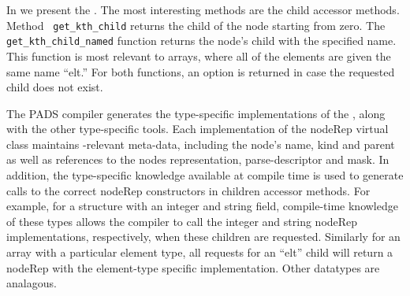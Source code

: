 
In  we present the \padx{} \absdm.  The most
interesting methods are the child accessor methods. Method {\tt
  get\_kth\_child} returns the  child of the node starting from
zero. The {\tt get\_kth\_child\_named} function returns the node's
 child with the specified name. This function is most relevant
to arrays, where all of the elements are given the same name ``elt.''
For both functions, an option is returned in case the requested child
does not exist.

The PADS compiler generates the type-specific implementations of the
\padx \absdm, along with the other type-specific tools.  Each
implementation of the nodeRep virtual class maintains \xml{}-relevant
meta-data, including the node's name, kind and parent as well as
references to the nodes representation, parse-descriptor and mask.  In
addition, the type-specific knowledge available at compile time is
used to generate calls to the correct nodeRep constructors in children
accessor methods.  For example, for a structure with an integer and
string field, compile-time knowledge of these types allows the
compiler to call the integer and string nodeRep implementations,
respectively, when these children are requested. Similarly for an
array with a particular element type, all requests for an ``elt''
child will return a nodeRep with the element-type specific
implementation. Other datatypes are analagous.





